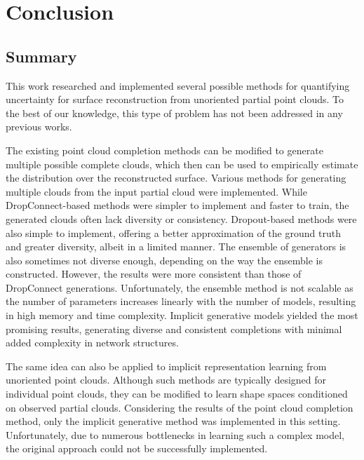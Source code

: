 \chapter{Conclusion}\label{ch:conclusion}
\section{Summary}
This work researched and implemented several possible methods for quantifying uncertainty for surface reconstruction from unoriented partial point clouds. To the best of our knowledge, this type of problem has not been addressed in any previous works. 

The existing point cloud completion methods can be modified to generate multiple possible complete clouds, which then can be used to empirically estimate the distribution over the reconstructed surface. Various methods for generating multiple clouds from the input partial cloud were implemented. While DropConnect-based methods were simpler to implement and faster to train, the generated clouds often lack diversity or consistency. Dropout-based methods were also simple to implement, offering a better approximation of the ground truth and greater diversity, albeit in a limited manner. The ensemble of generators is also sometimes not diverse enough, depending on the way the ensemble is constructed. However, the results were more consistent than those of DropConnect generations. Unfortunately, the ensemble method is not scalable as the number of parameters increases linearly with the number of models, resulting in high memory and time complexity. Implicit generative models yielded the most promising results, generating diverse and consistent completions with minimal added complexity in network structures.

The same idea can also be applied to implicit representation learning from unoriented point clouds. Although such methods are typically designed for individual point clouds, they can be modified to learn shape spaces conditioned on observed partial clouds. Considering the results of the point cloud completion method, only the implicit generative method was implemented in this setting. Unfortunately, due to numerous bottlenecks in learning such a complex model, the original approach could not be successfully implemented. 

